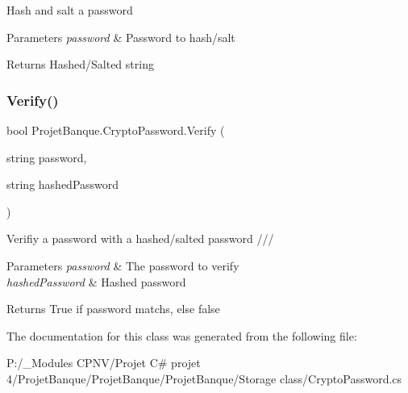 Hash and salt a password 


\begin{DoxyParams}{Parameters}
{\em password} & Password to hash/salt\\
\hline
\end{DoxyParams}
\begin{DoxyReturn}{Returns}
Hashed/\+Salted string
\end{DoxyReturn}
\mbox{\label{class_projet_banque_1_1_crypto_password_a386f50e2b9d7b64fb52a3f56a638a2bd}} 
\subsubsection{\texorpdfstring{Verify()}{Verify()}}
{\footnotesize\ttfamily bool Projet\+Banque.\+Crypto\+Password.\+Verify (\begin{DoxyParamCaption}\item[{string}]{password,  }\item[{string}]{hashed\+Password }\end{DoxyParamCaption})}



Verifiy a password with a hashed/salted password /// 


\begin{DoxyParams}{Parameters}
{\em password} & The password to verify\\
\hline
{\em hashed\+Password} & Hashed password\\
\hline
\end{DoxyParams}
\begin{DoxyReturn}{Returns}
True if password matchs, else false
\end{DoxyReturn}


The documentation for this class was generated from the following file\+:\begin{DoxyCompactItemize}
\item 
P\+:/\+\_\+\+Modules C\+P\+N\+V/\+Projet C\# projet 4/\+Projet\+Banque/\+Projet\+Banque/\+Projet\+Banque/\+Storage class/Crypto\+Password.\+cs\end{DoxyCompactItemize}
